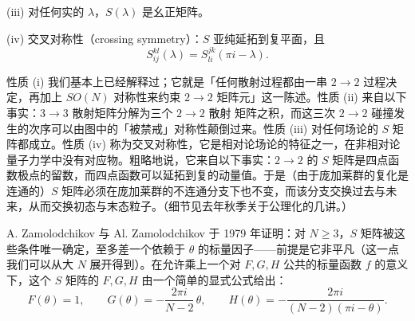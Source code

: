 \noindent(iii) 对任何实的 $\lambda$，$S(\lambda)$ 是幺正矩阵。

\noindent(iv) 交叉对称性（crossing symmetry）：$S$ 亚纯延拓到复平面，且
\[
S_{ij}^{kl}(\lambda)=S_{li}^{jk}(\pi i-\lambda).
\]

性质 (i) 我们基本上已经解释过；它就是「任何散射过程都由一串 $2\to2$ 过程决定，再加上 $SO(N)$ 对称性来约束 $2\to2$ 矩阵元」这一陈述。性质 (ii) 来自以下事实：$3\to3$ 散射矩阵分解为三个 $2\to2$ 散射
矩阵之积，而这三次 $2\to2$ 碰撞发生的次序可以由图中的「被禁戒」对称性颠倒过来。性质 (iii) 对任何场论的 $S$ 矩阵都成立。性质 (iv) 称为交叉对称性，它是相对论场论的特征之一，在非相对论量子力学中没有对应物。粗略地说，它来自以下事实：$2\to2$ 的 $S$ 矩阵是四点函数极点的留数，而四点函数可以延拓到复的动量值。于是（由于庞加莱群的复化是连通的）$S$ 矩阵必须在庞加莱群的不连通分支下也不变，而该分支交换过去与未来，从而交换初态与末态粒子。（细节见去年秋季关于公理化的几讲。）


A. Zamolodchikov 与 Al. Zamolodchikov 于 1979 年证明：对 $N\ge3$，$S$ 矩阵被这些条件唯一确定，至多差一个依赖于 $\theta$ 的标量因子——前提是它非平凡（这一点我们可以从大 $N$ 展开得到）。在允许乘上一个对 $F,G,H$ 公共的标量函数 $f$ 的意义下，这个 $S$ 矩阵的 $F,G,H$ 由一个简单的显式公式给出：
\begin{equation}
  \tag{4.24}
  \label{eq:4-24}
  F(\theta)=1,\qquad G(\theta)=-\frac{2\pi i}{N-2}\,\theta,\qquad H(\theta)=-\frac{2\pi i}{(N-2)(\pi i-\theta)}.
\end{equation}

